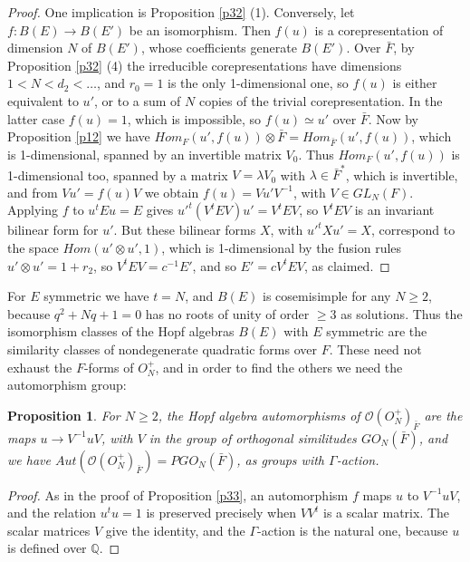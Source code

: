 \documentclass[11pt]{amsart}
\newtheorem{proposition}[theorem]{Proposition}
\theoremstyle{definition}
\begin{document}
\begin{proof}
One implication is Proposition \ref{p32} (1). Conversely, let $f:B(E)\to B(E')$ be an isomorphism. Then $f(u)$ is a corepresentation of dimension $N$ of $B(E')$, whose coefficients generate $B(E')$. Over $\bar F$, by Proposition \ref{p32} (4) the irreducible corepresentations have dimensions $1<N<d_2<\ldots$, and $r_0=1$ is the only 1-dimensional one, so $f(u)$ is either equivalent to $u'$, or to a sum of $N$ copies of the trivial corepresentation. In the latter case $f(u)=1$, which is impossible, so $f(u)\simeq u'$ over $\bar F$. Now by Proposition \ref{p12} we have $Hom_F(u',f(u))\otimes\bar F=Hom_{\bar F}(u',f(u))$, which is 1-dimensional, spanned by an invertible matrix $V_0$. Thus $Hom_F(u',f(u))$ is 1-dimensional too, spanned by a matrix $V=\lambda V_0$ with $\lambda\in\bar F^*$, which is invertible, and from $Vu'=f(u)V$ we obtain $f(u)=Vu'V^{-1}$, with $V\in GL_N(F)$. Applying $f$ to $u^tEu=E$ gives $u'^t(V^tEV)u'=V^tEV$, so $V^tEV$ is an invariant bilinear form for $u'$. But these bilinear forms $X$, with $u'^tXu'=X$, correspond to the space $Hom(u'\otimes u',1)$, which is 1-dimensional by the fusion rules $u'\otimes u'=1+r_2$, so $V^tEV=c^{-1}E'$, and so $E'=cV^tEV$, as claimed.
\end{proof}

For $E$ symmetric we have $t=N$, and $B(E)$ is cosemisimple for any $N\geq2$, because $q^2+Nq+1=0$ has no roots of unity of order $\geq3$ as solutions. Thus the isomorphism classes of the Hopf algebras $B(E)$ with $E$ symmetric are the similarity classes of nondegenerate quadratic forms over $F$. These need not exhaust the $F$-forms of $O_N^+$, and in order to find the others we need the automorphism group:

\begin{proposition}
\label{p34}
For $N\geq2$, the Hopf algebra automorphisms of $\mathcal O(O_N^+)_{\bar F}$ are the maps $u\to V^{-1}uV$, with $V$ in the group of orthogonal similitudes $GO_N(\bar F)$, and we have $Aut(\mathcal O(O_N^+)_{\bar F})=PGO_N(\bar F)$, as groups with $\Gamma$-action.
\end{proposition}

\begin{proof}
As in the proof of Proposition \ref{p33}, an automorphism $f$ maps $u$ to $V^{-1}uV$, and the relation $u^tu=1$ is preserved precisely when $VV^t$ is a scalar matrix. The scalar matrices $V$ give the identity, and the $\Gamma$-action is the natural one, because $u$ is defined over $\mathbb Q$.
\end{proof}
\end{document}
